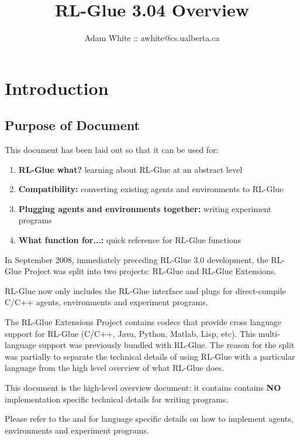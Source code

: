 \documentclass[11pt]{article}
\title{RL-Glue 3.04 Overview}
\author{Adam White :: awhite@cs.ualberta.ca}
\date{}
\begin{document}
\maketitle
\tableofcontents


\section{Introduction}
\subsection{Purpose of Document}
This document has been laid out so that it can be used for: 
\begin{enumerate}
\item  {\bf RL-Glue what?} learning about RL-Glue at an abstract level
\item {\bf Compatibility:} converting existing agents and environments to RL-Glue
\item {\bf Plugging agents and environments together:} writing experiment programs
\item{\bf What function for...:} quick reference for RL-Glue functions
\end{enumerate}

In September 2008, immediately preceding RL-Glue 3.0 development, the RL-Glue Project was split into two projects: RL-Glue and RL-Glue Extensions.

RL-Glue now only includes the RL-Glue interface and plugs for direct-compile C/C++ agents, environments and experiment programs.

The RL-Glue Extensions Project contains codecs that provide cross language support for RL-Glue (C/C++, Java, Python, Matlab, Lisp, etc).  This multi-language support was previously bundled with RL-Glue.  The reason for the split was partially to separate the technical details of using RL-Glue with a particular language from the high level overview of what RL-Glue does.

This document is the high-level overview document: it contains contains {\bf NO} implementation specific technical details for writing programs.

Please refer to the  and  for language specific details on how to implement agents, environments and experiment programs.
 
\end{document}
